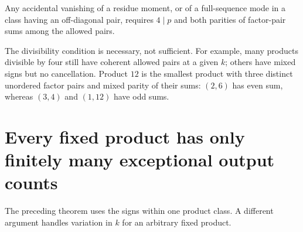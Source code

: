 \documentclass[11pt,a4paper]{article}
\numberwithin{equation}{section}
\theoremstyle{definition}
\theoremstyle{remark}
\begin{document}
\begin{corollary}\label{sc:cor:fourdivides}
Any accidental vanishing of a residue moment, or of a full-sequence mode
in a class having an off-diagonal pair, requires $4\mid p$ and both
parities of factor-pair sums among the allowed pairs.
\end{corollary}

The divisibility condition is necessary, not sufficient. For example,
many products divisible by four still have coherent allowed pairs at a
given $k$; others have mixed signs but no cancellation. Product $12$ is
the smallest product with three distinct unordered factor pairs and mixed
parity of their sums: $(2,6)$ has even sum, whereas $(3,4)$ and
$(1,12)$ have odd sums.

\section{Every fixed product has only finitely many exceptional output counts}\label{sc:sec:fixed}

The preceding theorem uses the signs within one product class. A different
argument handles variation in $k$ for an arbitrary fixed product.
\end{document}
